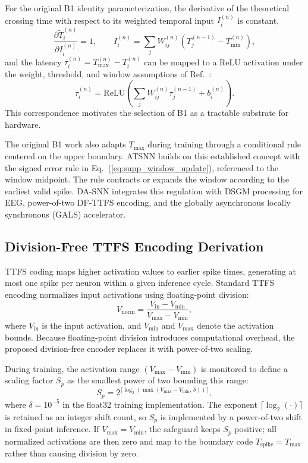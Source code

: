 ﻿\documentclass[12pt]{article}
\begin{document}
For the original B1 identity parameterization, the derivative of the theoretical crossing time with respect to its weighted temporal input $I_i^{(n)}$ is constant,
\begin{equation}
\frac{\partial \tilde{T}_i^{(n)}}{\partial I_i^{(n)}}=1,
\qquad
I_i^{(n)}=\sum_j W_{ij}^{(n)}\!\left(T_j^{(n-1)}-T_{\min}^{(n)}\right),
\label{eq:b1_slope}
\end{equation}
and the latency $\tau_i^{(n)}=T_{\max}^{(n)}-T_i^{(n)}$ can be mapped to a ReLU activation under the weight, threshold, and window assumptions of Ref.~\cite{ref46}:
\begin{equation}
\tau_i^{(n)}=\mathrm{ReLU}\!\left(\sum_j W_{ij}^{(n)}\tau_j^{(n-1)}+b_i^{(n)}\right).
\label{eq:b1_relu}
\end{equation}
This correspondence motivates the selection of B1 as a tractable substrate for hardware.

The original B1 work also adapts $T_{\max}$ during training through a conditional rule centered on the upper boundary. ATSNN builds on this established concept with the signed error rule in Eq.~(\ref{eq:supp_window_update}), referenced to the window midpoint. The rule contracts or expands the window according to the earliest valid spike. DA-SNN integrates this regulation with DSGM processing for EEG, power-of-two DF-TTFS encoding, and the globally asynchronous locally synchronous (GALS) accelerator.

\subsection{Division-Free TTFS Encoding Derivation}

TTFS coding maps higher activation values to earlier spike times, generating at most one spike per neuron within a given inference cycle. Standard TTFS encoding normalizes input activations using floating-point division:
\begin{equation}
V_{\mathrm{norm}} = \frac{V_{\mathrm{in}}-V_{\min}}{V_{\max}-V_{\min}},
\end{equation}
where $V_{\mathrm{in}}$ is the input activation, and $V_{\min}$ and $V_{\max}$ denote the activation bounds. Because floating-point division introduces computational overhead, the proposed division-free encoder replaces it with power-of-two scaling. 

During training, the activation range $(V_{\max}-V_{\min})$ is monitored to define a scaling factor $S_p$ as the smallest power of two bounding this range:
\begin{equation}
S_p = 2^{\lceil \log_2(\max(V_{\max}-V_{\min},\,\delta)) \rceil},
\end{equation}
where $\delta=10^{-5}$ in the float32 training implementation. The exponent $\lceil\log_2(\cdot)\rceil$ is retained as an integer shift count, so $S_p$ is implemented by a power-of-two shift in fixed-point inference. If $V_{\max}=V_{\min}$, the safeguard keeps $S_p$ positive; all normalized activations are then zero and map to the boundary code $T_{\mathrm{spike}}=T_{\max}$ rather than causing division by zero.
\end{document}

